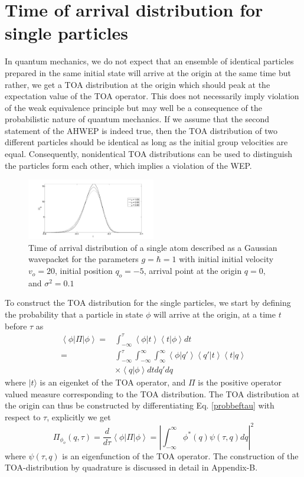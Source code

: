 \documentclass[%
 reprint,
 amsmath,amssymb,
 aps,
]{revtex4-1}
\newcommand{\opr}[1]{\ensuremath{\mathbf{\mathsf{#1}}}}
\newcommand{\abs}[1]{\ensuremath{\left|#1\right|}}
\newcommand{\dirac}[2]{\ensuremath{\left<#1\left|\right.#2\right>}}
\newcommand{\expec}[3]{\ensuremath{\left.\left<#1\left|#2\right|#3\right>\right.}}
\begin{document}
\section{Time of arrival distribution for single particles}
\label{sec:toa_dist}

In quantum mechanics, we do not expect that an ensemble of identical particles prepared in the same initial state will arrive at the origin at the same time but rather, we get a TOA distribution at the origin which should peak at the expectation value of the TOA operator. This does not necessarily imply violation of the weak equivalence principle but may well be a consequence of the probabilistic nature of quantum mechanics. If we assume that the second statement of the AHWEP is indeed true, then the TOA distribution of two different particles should be identical as long as the initial group velocities are equal. Consequently, nonidentical TOA distributions can be used to distinguish the particles form each other, which implies a violation of the WEP. 

\begin{figure}[t]
	\centering
	\includegraphics[width = 0.5\textwidth]{toadist_mi_equal_mg_overlay}
	\caption{Time of arrival distribution of a single atom described as a Gaussian wavepacket for the parameters $g=\hbar=1$ with initial initial velocity $v_o=20$, initial position $q_o=-5$, arrival point at the origin $q=0$, and $\sigma^2=0.1$}
	\label{fig:dist_mieqmg}
\end{figure}

To construct the TOA distribution for the single particles, we start by defining the probability that a particle in state $\phi$ will arrive at the origin, at a time $t$ before $\tau$ as
\begin{align}
\expec{\phi}{\opr{\Pi}}{\phi} =& \int_{-\infty}^{\tau}\dirac{\phi}{t}\dirac{t}{\phi} dt \nonumber \\
=&\int_{-\infty}^{\tau}\int_{-\infty}^{\infty}\int_{\infty}^{\infty} \dirac{\phi}{q'}\dirac{q'}{t}\dirac{t}{q} \nonumber \\
&\times \dirac{q}{\phi} dt dq' dq
\label{probbeftau}
\end{align}
where $| t \rangle$ is an eigenket of the TOA operator, and $\opr{\Pi}$ is the positive operator valued measure corresponding to the TOA distribution. The TOA distribution at the origin can thus be constructed by differentiating Eq. \eqref{probbeftau} with respect to $\tau$, explicitly we get
\begin{equation}
\Pi_{\phi_o}(q,\tau) = \dfrac{d}{d\tau}\expec{\phi}{\opr{\Pi}}{\phi} = \abs{\int_{-\infty}^{\infty}\phi^{*}(q)\psi(\tau,q)dq}^2 
\label{toadistribution}
\end{equation}
where $\psi(\tau,q)$ is an eigenfunction of the TOA operator. The construction of the TOA-distribution by quadrature is discussed in detail in Appendix-B.
\end{document}
